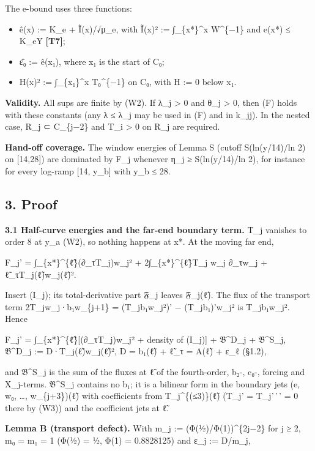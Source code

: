 \documentclass[
]{article}
\providecommand{\tightlist}{%
  \setlength{\itemsep}{0pt}\setlength{\parskip}{0pt}}
\begin{document}
The e-bound uses three functions:

\begin{itemize}
\tightlist
\item
  ê(x) := K\_e + Ĩ(x)/√μ\_e, with Ĩ(x)² := ∫\_\{x*\}\^{}x W\^{}\{−1\}
  and \textbar e(x*)\textbar{} ≤ K\_eȲ \textbf{{[}T7{]}};
\item
  ε̂₀ := ê(x₁), where x₁ is the start of C₀;
\item
  H(x)² := ∫\_\{x₁\}\^{}x T₀\^{}\{−1\} on C₀, with H := 0 below x₁.
\end{itemize}

\textbf{Validity.} All sups are finite by (W2). If λ\_j \textgreater{} 0
and θ\_j \textgreater{} 0, then (F) holds with these constants (any λ ≤
λ\_j may be used in (F) and in k\_jj). In the nested case, R\_j ⊂
C\_\{j−2\} and T\_i \textgreater{} 0 on R\_j are required.

\textbf{Hand-off coverage.} The window energies of Lemma S (cutoff
S(ln(y/14)/ln 2) on {[}14,28{]}) are dominated by F\_j whenever η\_j ≥
S(ln(y/14)/ln 2), for instance for every log-ramp {[}14, y\_b{]} with
y\_b ≤ 28.

\hypertarget{proof}{%
\subsection{3. Proof}\label{proof}}

\textbf{3.1 Half-curve energies and the far-end boundary term.} T\_j
vanishes to order 8 at y\_a (W2), so nothing happens at x*. At the
moving far end,

F\_j' = ∫\_\{x*\}\^{}\{ℓ̃\}(∂\_τT\_j)w\_j² + 2∫\_\{x*\}\^{}\{ℓ̃\}T\_j w\_j
∂\_τw\_j + ℓ̃\_τT\_j(ℓ̃)w\_j(ℓ̃)².

Insert (I\_j); its total-derivative part 𝔉\_j leaves 𝔉\_j(ℓ̃). The flux
of the transport term 2T\_jw\_j·b₁w\_\{j+1\} = (T\_jb₁w\_j²)' −
(T\_jb₁)'w\_j² is T\_jb₁w\_j². Hence

F\_j' = ∫\_\{x*\}\^{}\{ℓ̃\}{[}(∂\_τT\_j)w\_j² + density of (I\_j){]} +
𝔅\^{}D\_j + 𝔅\^{}S\_j, 𝔅\^{}D\_j := D·T\_j(ℓ̃)w\_j(ℓ̃)², D = b₁(ℓ̃) + ℓ̃\_τ
= A(ℓ̃) + ε\_ℓ (§1.2),

and 𝔅\^{}S\_j is the sum of the fluxes at ℓ̃ of the fourth-order, b₂-,
c₀-, forcing and X\_j-terms. 𝔅\^{}S\_j contains no b₁; it is a bilinear
form in the boundary jets (e, w₀, \ldots, w\_\{j+3\})(ℓ̃) with
coefficients from T\_j\^{}\{(≤3)\}(ℓ̃) (T\_j' = T\_j'\,'\,' = 0 there by
(W3)) and the coefficient jets at ℓ̃.

\textbf{Lemma B (transport defect).} With m\_j :=
(Φ(½)/Φ(1))\^{}\{2j−2\} for j ≥ 2, m₀ = m₁ = 1 (Φ(½) = ½, Φ(1) =
0.8828125) and ε\_j := \textbar D\textbar/m\_j,
\end{document}
